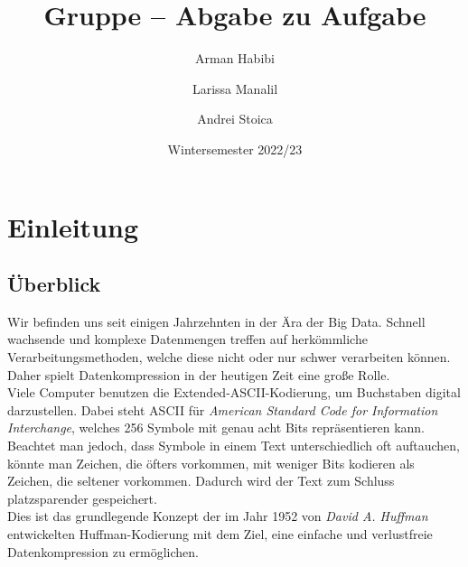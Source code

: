 \documentclass[course=erap]{aspdoc}
\author{Arman Habibi \and Larissa Manalil \and Andrei Stoica}
\date{Wintersemester 2022/23}
\title{Gruppe \theGroup{} -- Abgabe zu Aufgabe \theNumber}
\begin{document}
\maketitle

\section{Einleitung}
\subsection{Überblick}

Wir befinden uns seit einigen Jahrzehnten in der Ära der Big Data. Schnell wachsende und komplexe Datenmengen treffen auf herkömmliche Verarbeitungsmethoden, welche diese nicht oder nur schwer verarbeiten können. Daher spielt Datenkompression in der heutigen Zeit eine große Rolle.\\
Viele Computer benutzen die Extended-ASCII-Kodierung, um Buchstaben digital darzustellen. Dabei steht ASCII für \textit{American Standard Code for Information Interchange}, welches 256 Symbole mit genau acht Bits repräsentieren kann.\cite{Ascii} Beachtet man jedoch, dass Symbole in einem Text unterschiedlich oft auftauchen, könnte man Zeichen, die öfters vorkommen, mit weniger Bits kodieren als Zeichen, die seltener vorkommen. Dadurch wird der Text zum Schluss platzsparender gespeichert.\\
Dies ist das grundlegende Konzept der im Jahr 1952 von \textit{David A. Huffman} entwickelten Huffman-Kodierung mit dem Ziel, eine einfache und verlustfreie Datenkompression zu ermöglichen.
\end{document}
